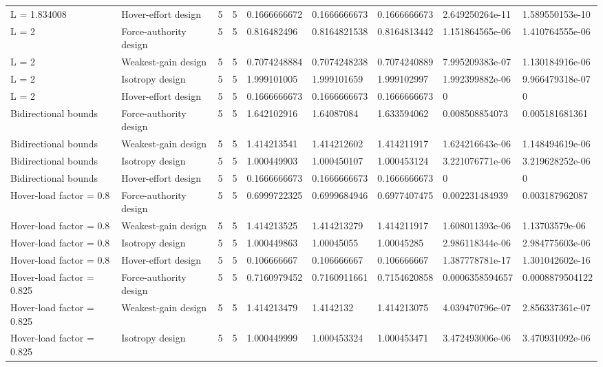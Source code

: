 \begin{tabular}{@{}lllllllll@{}}
L = 1.834008 & Hover-effort design & 5 & 5 & 0.1666666672 & 0.1666666673 & 0.1666666673 & 2.649250264e-11 & 1.589550153e-10 \\
L = 2 & Force-authority design & 5 & 5 & 0.816482496 & 0.8164821538 & 0.8164813442 & 1.151864565e-06 & 1.410764555e-06 \\
L = 2 & Weakest-gain design & 5 & 5 & 0.7074248884 & 0.7074248238 & 0.7074240889 & 7.995209383e-07 & 1.130184916e-06 \\
L = 2 & Isotropy design & 5 & 5 & 1.999101005 & 1.999101659 & 1.999102997 & 1.992399882e-06 & 9.966479318e-07 \\
L = 2 & Hover-effort design & 5 & 5 & 0.1666666673 & 0.1666666673 & 0.1666666673 & 0 & 0 \\
Bidirectional bounds & Force-authority design & 5 & 5 & 1.642102916 & 1.64087084 & 1.633594062 & 0.008508854073 & 0.005181681361 \\
Bidirectional bounds & Weakest-gain design & 5 & 5 & 1.414213541 & 1.414212602 & 1.414211917 & 1.624216643e-06 & 1.148494619e-06 \\
Bidirectional bounds & Isotropy design & 5 & 5 & 1.000449903 & 1.000450107 & 1.000453124 & 3.221076771e-06 & 3.219628252e-06 \\
Bidirectional bounds & Hover-effort design & 5 & 5 & 0.1666666673 & 0.1666666673 & 0.1666666673 & 0 & 0 \\
Hover-load factor = 0.8 & Force-authority design & 5 & 5 & 0.6999722325 & 0.6999684946 & 0.6977407475 & 0.002231484939 & 0.003187962087 \\
Hover-load factor = 0.8 & Weakest-gain design & 5 & 5 & 1.414213525 & 1.414213279 & 1.414211917 & 1.608011393e-06 & 1.13703579e-06 \\
Hover-load factor = 0.8 & Isotropy design & 5 & 5 & 1.000449863 & 1.00045055 & 1.00045285 & 2.986118344e-06 & 2.984775603e-06 \\
Hover-load factor = 0.8 & Hover-effort design & 5 & 5 & 0.106666667 & 0.106666667 & 0.106666667 & 1.387778781e-17 & 1.301042602e-16 \\
Hover-load factor = 0.825 & Force-authority design & 5 & 5 & 0.7160979452 & 0.7160911661 & 0.7154620858 & 0.0006358594657 & 0.0008879504122 \\
Hover-load factor = 0.825 & Weakest-gain design & 5 & 5 & 1.414213479 & 1.4142132 & 1.414213075 & 4.039470796e-07 & 2.856337361e-07 \\
Hover-load factor = 0.825 & Isotropy design & 5 & 5 & 1.000449999 & 1.000453324 & 1.000453471 & 3.472493006e-06 & 3.470931092e-06 \\

\end{tabular}
